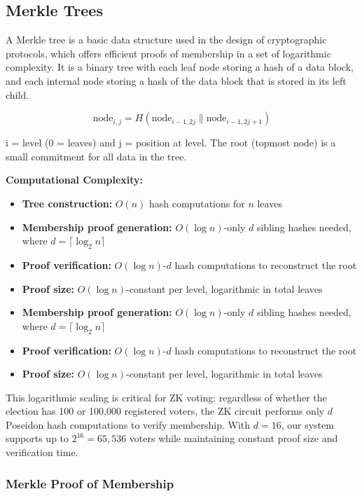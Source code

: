 \documentclass[12pt, a4paper]{report}
\begin{document}
\subsection{Merkle Trees}

A Merkle tree \cite{merkle1988digital} is a basic data structure used in the design of cryptographic protocols, which offers efficient proofs of membership in a set of logarithmic complexity. It is a binary tree with each leaf node storing a hash of a data block, and each internal node storing a hash of the data block that is stored in its left child.

\begin{equation}
\text{node}_{i,j} = H(\text{node}_{i-1, 2j} \| \text{node}_{i-1, 2j+1})
\label{eq:merkle_node}
\end{equation}

i = level (0 = leaves) and j = position at level. The root (topmost node) is a small commitment for all data in the tree.

\textbf{Computational Complexity:}
\begin{itemize}
    \item \textbf{Tree construction:} $O(n)$ hash computations for $n$ leaves
    \item \textbf{Membership proof generation:} $O(\log n)$-only $d$ sibling hashes needed, where $d = \lceil \log_2 n \rceil$
    \item \textbf{Proof verification:} $O(\log n)$-$d$ hash computations to reconstruct the root
    \item \textbf{Proof size:} $O(\log n)$-constant per level, logarithmic in total leaves
    \item \textbf{Membership proof generation:} $O(\log n)$-only $d$ sibling hashes needed, where $d = \lceil \log_2 n \rceil$
    \item \textbf{Proof verification:} $O(\log n)$-$d$ hash computations to reconstruct the root
    \item \textbf{Proof size:} $O(\log n)$-constant per level, logarithmic in total leaves
\end{itemize}

This logarithmic scaling is critical for ZK voting: regardless of whether the election has 100 or 100,000 registered voters, the ZK circuit performs only $d$ Poseidon hash computations to verify membership. With $d = 16$, our system supports up to $2^{16} = 65{,}536$ voters while maintaining constant proof size and verification time.

\subsubsection{Merkle Proof of Membership}
\end{document}
